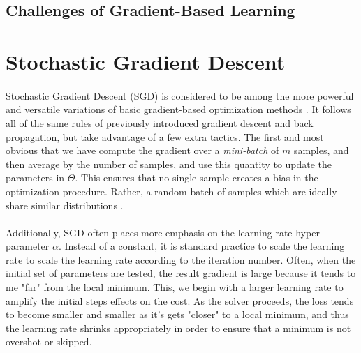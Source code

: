 \documentclass[12pt,letterpaper]{article}
\begin{document}

\subsection{Challenges of Gradient-Based Learning}



\section{Stochastic Gradient Descent}

\paragraph*{}Stochastic Gradient Descent (SGD) is considered to be among the more powerful and versatile variations of basic gradient-based optimization methods \cite{Geron}. It follows all of the same rules of previously introduced gradient descent and back propagation, but take advantage of a few extra tactics. The first and most obvious that we have compute the gradient over a \textit{mini-batch} of $m$ samples, and then average by the number of samples, and use this quantity to update the parameters in $\Theta$. This ensures that no single sample creates a bias in the optimization procedure. Rather, a random batch of samples which are ideally share similar distributions \cite{James}.

\paragraph*{}Additionally, SGD often places more emphasis on the learning rate hyper-parameter $\alpha$. Instead of a constant, it is standard practice to  scale the learning rate to scale the learning rate according to the iteration number. Often, when the initial set of parameters are tested, the result gradient is large because it tends to me "far" from the local minimum. This, we begin with a larger learning rate to amplify the initial steps effects on the cost. As the solver proceeds, the loss tends to become smaller and smaller as it's gets "closer" to a local minimum, and thus the learning rate shrinks appropriately in order to ensure that a minimum is not overshot or skipped.
\end{document}
